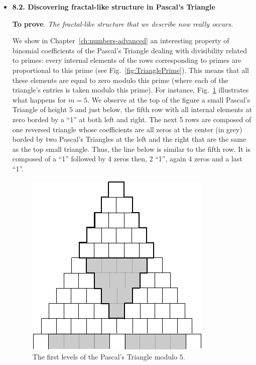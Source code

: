 


\begin{itemize}

\item
{\bf 8.2. Discovering fractal-like structure in Pascal's Triangle}

{\bf To prove}.  {\em The fractal-like structure that we describe now really occurs.}
\smallskip

We show in Chapter~\ref{ch:numbers-advanced} an interesting property of binomial coefficients of the Pascal's Triangle
dealing with divisibility related to primes: 
every internal elements of the rows corresponding to primes are proportional to this prime
(see Fig.~\ref{fig:TrianglePrime}).
This means that all these elements are equal to zero modulo this prime 
 (where each of the triangle's entries is taken modulo this prime).
For instance, Fig.~\ref{fig:TriangleFractalFirstlevels} illustrates what happens for $m=5$. 
We observe at the top of the figure a small Pascal's Triangle of height $5$ and just below, the fifth row with
all internal elements at zero borded by a ``1'' at both left and right.
The next 5 rows are composed of one reversed triangle whose coefficients are all zeros at the center (in grey) borded by two Pascal's Triangles at the left and the right that are the same as the top small triangle.
Thus, the line below is similar to the fifth row. It is composed of a ``1'' followed by 4 zeros then, 2 ``1'', again 4 zeros and a last ``1''. 
\begin{figure}[ht]
\begin{center}
	\includegraphics[scale=0.4]{FiguresArithmetic/PascalFractalFirstlevels.png}
	        \caption{The first levels of the Pascal's Triangle modulo $5$.}
        \label{fig:TriangleFractalFirstlevels}
\end{center}
\end{figure}


\end{itemize}
